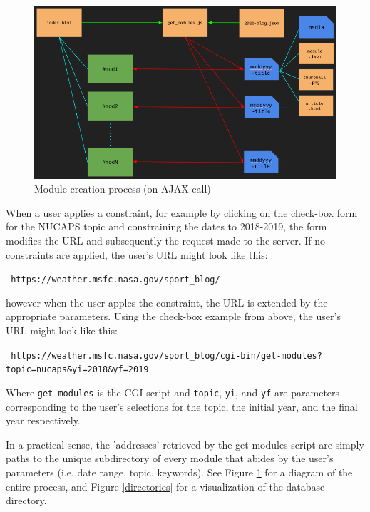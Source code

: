 \documentclass[12pt]{article}
\begin{document}
\newpage

\begin{figure}[h]
  \centering
  \includegraphics[width=.8\linewidth]{./figures/module-fill.png}
  \caption{Module creation process (on AJAX call)}
  \label{module creation} %
\end{figure}

When a user applies a constraint, for example by clicking on the check-box form for the NUCAPS topic and constraining the dates to 2018-2019, the form modifies the URL and subsequently the request made to the server. If no constraints are applied, the user's URL might look like this:

\begin{center}\tt\footnotesize
  https://weather.msfc.nasa.gov/sport\_blog/
\end{center}

\noindent
however when the user apples the constraint, the URL is extended by the appropriate parameters. Using the check-box example from above, the user's URL might look like this:

\begin{center}\tt\footnotesize
  https://weather.msfc.nasa.gov/sport\_blog/cgi-bin/get-modules?topic=nucaps\&yi=2018\&yf=2019
\end{center}

Where \texttt{get-modules} is the CGI script and \texttt{topic}, \texttt{yi}, and \texttt{yf} are parameters corresponding to the user's selections for the topic, the initial year, and the final year respectively.

In a practical sense, the 'addresses' retrieved by the get-modules script are simply paths to the unique subdirectory of every module that abides by the user's parameters (i.e. date range, topic, keywords). See Figure \ref{module creation} for a diagram of the entire process, and Figure \ref{directories} for a visualization of the database directory.
\end{document}
